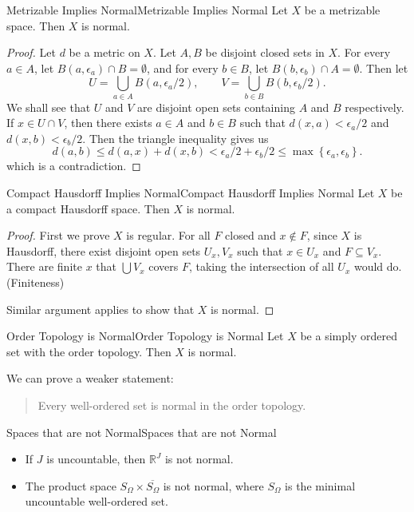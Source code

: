 \documentclass[../main.tex]{subfiles}
\begin{document}
\begin{theorem}{Metrizable Implies Normal}{Metrizable Implies Normal}
Let $X$ be a metrizable space. Then $X$ is normal.
\end{theorem}
\begin{proof}
	Let $d$ be a metric on $X$. Let $A,B$ be disjoint closed sets in $X$. For every $a\in A$, let $B(a,\epsilon_a)\cap B = \emptyset $, and for every $b\in B$, let $B(b,\epsilon_b)\cap A = \emptyset$. Then let
	\begin{equation*}
		U = \bigcup_{a\in A} B(a,\epsilon_a / 2), \qquad V = \bigcup_{b\in B} B(b,\epsilon_b / 2).
	\end{equation*}
	We shall see that $U$ and $V$ are disjoint open sets containing $A$ and $B$ respectively. If $x\in U\cap V$, then there exists $a\in A$ and $b\in B$ such that $d(x,a) < \epsilon_a / 2$ and $d(x,b) < \epsilon_b / 2$. Then the triangle inequality gives us
	\begin{equation*}
		d(a,b) \leq d(a,x) + d(x,b) < \epsilon_a / 2 + \epsilon_b / 2 \leq \max\left\{ \epsilon_a, \epsilon_b \right\}.
	\end{equation*}
	which is a contradiction.
\end{proof}

\begin{theorem}{Compact Hausdorff Implies Normal}{Compact Hausdorff Implies Normal}
Let $X$ be a compact Hausdorff space. Then $X$ is normal.
\end{theorem}
\begin{proof}
	First we prove $X$ is regular. For all $F$ closed and $x\notin F$, since $X$ is Hausdorff, there exist disjoint open sets $U_x,V_x$ such that $x\in U_x$ and $F\subseteq V_x$. There are finite $x$ that $\bigcup V_x $ covers $F$, taking the intersection of all $U_x$ would do. (Finiteness)

	Similar argument applies to show that $X$ is normal.
\end{proof}

\begin{theorem}{Order Topology is Normal}{Order Topology is Normal}
Let $X$ be a simply ordered set with the order topology. Then $X$ is normal.
\end{theorem}

We can prove a weaker statement:
\begin{quote}
	Every well-ordered set is normal in the order topology.
\end{quote}

\begin{example}{Spaces that are not Normal}{Spaces that are not Normal}
\begin{itemize}
\item If $J$ is uncountable, then $\mathbb{R}^J$ is not normal.
\item The product space $S_{\Omega} \times \overline{S_{\Omega}}$ is not normal, where $S_{\Omega}$ is the minimal uncountable well-ordered set.
\end{itemize}
\end{example}
\end{document}
